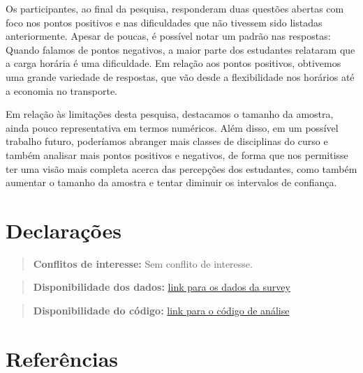 \documentclass[
  12pt,
  portuguese,
]{article}
\begin{document}
Os participantes, ao final da pesquisa, responderam duas questões
abertas com foco nos pontos positivos e nas dificuldades que não
tivessem sido listadas anteriormente. Apesar de poucas, é possível notar
um padrão nas respostas: Quando falamos de pontos negativos, a maior
parte dos estudantes relataram que a carga horária é uma dificuldade. Em
relação aos pontos positivos, obtivemos uma grande variedade de
respostas, que vão desde a flexibilidade nos horários até a economia no
transporte.

Em relação às limitações desta pesquisa, destacamos o tamanho da
amostra, ainda pouco representativa em termos numéricos. Além disso, em
um possível trabalho futuro, poderíamos abranger mais classes de
disciplinas do curso e também analisar mais pontos positivos e
negativos, de forma que nos permitisse ter uma visão mais completa
acerca das percepções dos estudantes, como também aumentar o tamanho da
amostra e tentar diminuir os intervalos de confiança.

\hypertarget{declarauxe7uxf5es}{%
\section{Declarações}\label{declarauxe7uxf5es}}

\begin{quote}
\textbf{Conflitos de interesse:} Sem conflito de interesse.
\end{quote}

\begin{quote}
\textbf{Disponibilidade dos dados:}
\href{https://github.com/Wesley-M/cc-students-ere-perceptions/blob/main/data/survey.csv}{link
para os dados da survey}
\end{quote}

\begin{quote}
\textbf{Disponibilidade do código:}
\href{https://github.com/Wesley-M/cc-students-ere-perceptions/}{link
para o código de análise}
\end{quote}

\newpage

\hypertarget{referuxeancias}{%
\section*{Referências}\label{referuxeancias}}
\end{document}
